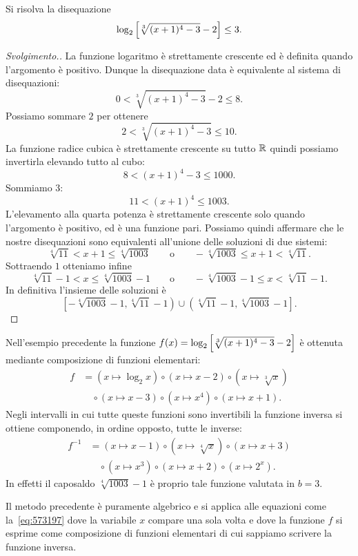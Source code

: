 \begin{example}
  Si risolva la disequazione 
  \[
   \log_2{\left[ \sqrt[3]{(x+1)^4-3}-2 \right]} \le 3. 
  \]
\end{example}%
\begin{proof}[Svolgimento.]
La funzione logaritmo è strettamente crescente ed è definita 
quando l'argomento è positivo. 
Dunque la disequazione data 
è equivalente al sistema di disequazioni:
\[
0 < \sqrt[3]{(x+1)^4 - 3} - 2 \le 8.  
\]
Possiamo sommare $2$ per ottenere 
\[
  2 < \sqrt[3]{(x+1)^4 - 3} \le 10.  
\]
La funzione radice cubica è strettamente crescente 
su tutto ${\mathbb R}$ quindi possiamo invertirla elevando 
tutto al cubo:
\[
 8 < (x+1)^4 - 3 \le 1000.
\]
Sommiamo $3$:
\[
11 < (x+1)^4 \le 1003.  
\]
L'elevamento alla quarta potenza è strettamente crescente 
solo quando l'argomento è positivo, ed è una funzione pari.
Possiamo quindi affermare che le nostre disequazioni sono 
equivalenti all'unione delle soluzioni di due sistemi:
\[
  \sqrt[4]{11} < x+1 \le \sqrt[4]{1003}
  \qquad\text{o}\qquad 
  -\sqrt[4]{1003} \le x+1 < \sqrt[4]{11}.
\]
Sottraendo $1$ otteniamo infine 
\[
  \sqrt[4]{11} -1 < x \le \sqrt[4]{1003} - 1
  \qquad\text{o}\qquad 
  -\sqrt[4]{1003} -1 \le x < \sqrt[4]{11} -1.
\]
In definitiva l'insieme delle soluzioni è 
\[
\left[-\sqrt[4]{1003} - 1, \sqrt[4]{11}-1\right)
\cup \left(\sqrt[4]{11}-1 , \sqrt[4]{1003} -1\right].  
\]
\end{proof}

Nell'esempio precedente la funzione 
$f(x) = \log_2{\left[ \sqrt[3]{(x+1)^4-3}-2 \right]}$
è ottenuta mediante composizione di funzioni elementari:
\begin{align*}
f &= (x\mapsto \log_2 x)\circ(x\mapsto x-2)\circ (x \mapsto \sqrt[3]{x})\\
  &\quad \circ (x \mapsto x-3) \circ (x\mapsto x^4) \circ (x\mapsto x+1).
\end{align*}
Negli intervalli in cui tutte queste funzioni sono invertibili 
la funzione inversa si ottiene componendo, in ordine opposto,
tutte le inverse:
\begin{align*}
  f^{-1} &= (x\mapsto x-1) \circ (x\mapsto \sqrt[4]{x}) \circ (x \mapsto x+3) \\
    &\quad \circ (x \mapsto x^3) \circ (x \mapsto x+2) \circ (x\mapsto 2^x).
\end{align*}
In effetti il caposaldo $\sqrt[4]{1003}-1$ è proprio tale 
funzione valutata in $b=3$.

Il metodo precedente è puramente algebrico e 
si applica alle equazioni 
come la~\eqref{eq:573197} dove la variabile $x$ 
compare una sola volta e dove la funzione $f$ si esprime 
come composizione di funzioni elementari di cui sappiamo 
scrivere la funzione inversa. 

